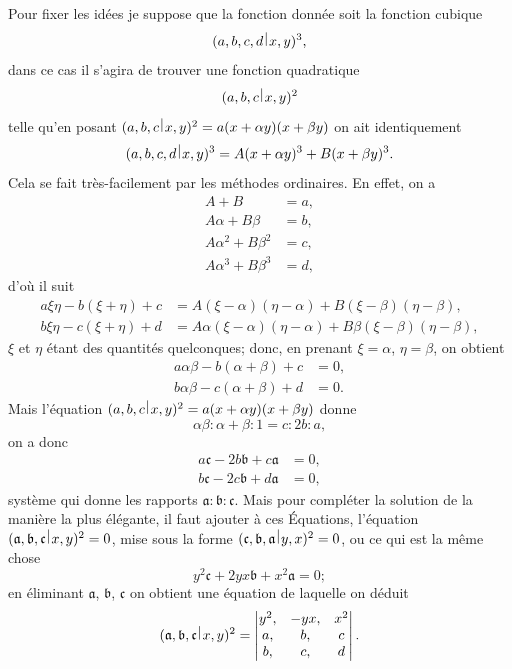 \documentclass[11pt,a4paper]{book}
\theoremstyle{plain}
\newcommand{\wrule}{\hspace{-0.1em}\mid\hspace{-0.1em}}
\begin{document}
Pour fixer les id\'{e}es je suppose que la fonction donn\'{e}e soit la fonction cubique
\[
(a,b,c,d\,\raisebox{0.5ex}{$\wrule$}\,x,y)^3,
\]
dans ce cas il s'agira de trouver une fonction quadratique
\[
(a,b,c\,\raisebox{0.5ex}{$\wrule$}\,x,y)^2
\]
telle qu'en posant $(a,b,c\,\raisebox{0.5ex}{$\wrule$}\,x,y)^2=a(x+\alpha y)(x+\beta y)$ on ait identiquement
\[
(a,b,c,d\,\raisebox{0.5ex}{$\wrule$}\,x,y)^3=A(x+\alpha y)^3+B(x+\beta y)^3.
\]
Cela se fait tr\`{e}s-facilement par les m\'{e}thodes ordinaires. En effet, on a
\begin{align*}
A+B&=a,\\
A\alpha+B\beta&=b,\\
A\alpha^2+B\beta^2&=c,\\
A\alpha^3+B\beta^3&=d,
\end{align*}
d'o\`{u} il suit
\begin{align*}
a\xi\eta-b(\xi+\eta)+c&=A(\xi-\alpha)(\eta-\alpha)+B(\xi-\beta)(\eta-\beta),\\
b\xi\eta-c(\xi+\eta)+d&=A\alpha(\xi-\alpha)(\eta-\alpha)+B\beta(\xi-\beta)(\eta-\beta),
\end{align*}
$\xi$ et $\eta$ \'{e}tant des quantit\'{e}s quelconques; donc, en prenant $\xi=\alpha$, $\eta=\beta$, on obtient
\begin{align*}
a\alpha\beta-b(\alpha+\beta)+c&=0,\\
b\alpha\beta-c(\alpha+\beta)+d&=0.
\end{align*}
Mais l'\'{e}quation $(a,b,c\,\raisebox{0.5ex}{$\wrule$}\,x,y)^2=a(x+\alpha y)(x+\beta y)$ donne
\[
\alpha\beta:\alpha+\beta:1=c:2b:a,
\]
on a donc
\begin{align*}
a\mathfrak{c}-2b\mathfrak{b}+c\mathfrak{a}&=0,\\
b\mathfrak{c}-2c\mathfrak{b}+d\mathfrak{a}&=0,
\end{align*}
syst\`{e}me qui donne les rapports $\mathfrak{a}:\mathfrak{b}:\mathfrak{c}$. Mais pour compl\'{e}ter la solution de la mani\`{e}re la plus \'{e}l\'{e}gante, il faut ajouter \`{a} ces \'{E}quations, l'\'{e}quation $(\mathfrak{a},\mathfrak{b},\mathfrak{c}\,\raisebox{0.5ex}{$\wrule$}\,x,y)^2=0$, mise sous la forme $(\mathfrak{c},\mathfrak{b},\mathfrak{a}\,\raisebox{0.5ex}{$\wrule$}\,y,x)^2=0$, ou ce qui est la m\^{e}me chose
\[
y^2\mathfrak{c}+2yx\mathfrak{b}+x^2\mathfrak{a}=0;
\]
en \'{e}liminant $\mathfrak{a}$, $\mathfrak{b}$, $\mathfrak{c}$ on obtient une \'{e}quation de laquelle on d\'{e}duit
\[
(\mathfrak{a},\mathfrak{b},\mathfrak{c}\,\raisebox{0.5ex}{$\wrule$}\,x,y)^2=\begin{vmatrix}
y^2, & -yx, & x^2\\
a, & b, & c\\
b, & c, & d
\end{vmatrix}.
\]
\end{document}
